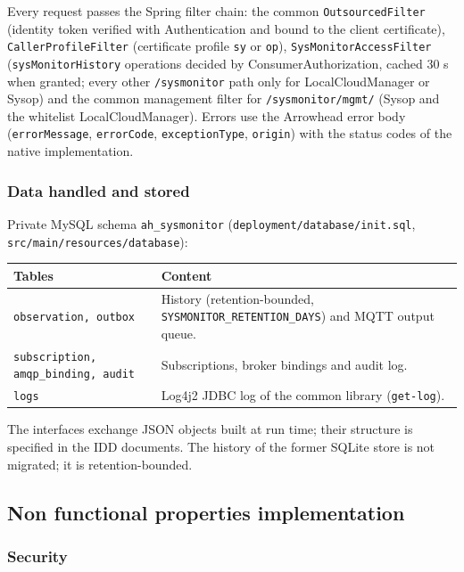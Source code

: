 \documentclass[a4paper]{arrowhead}
\begin{document}
Every request passes the Spring filter chain: the common \texttt{OutsourcedFilter} (identity token verified with Authentication and bound to the client certificate), \texttt{CallerProfileFilter} (certificate profile \texttt{sy} or \texttt{op}), \texttt{SysMonitorAccessFilter} (\texttt{sysMonitorHistory} operations decided by ConsumerAuthorization, cached 30 s when granted; every other \texttt{/sysmonitor} path only for LocalCloudManager or Sysop) and the common management filter for \texttt{/sysmonitor/\allowbreak{}mgmt/} (Sysop and the whitelist LocalCloudManager). Errors use the Arrowhead error body (\texttt{errorMessage}, \texttt{errorCode}, \texttt{exceptionType}, \texttt{origin}) with the status codes of the native implementation.

\subsubsection{Data handled and stored}

Private MySQL schema \texttt{ah\_\allowbreak{}sysmonitor} (\texttt{deployment/\allowbreak{}database/\allowbreak{}init.sql}, \texttt{src/\allowbreak{}main/\allowbreak{}resources/\allowbreak{}database}):

\noindent\begin{longtable}{| p{6.4cm} | p{8.8cm} |} \hline
\rowcolor{gray!33} Tables & Content \\ \hline \endhead
\texttt{observation,\allowbreak{} outbox} & History (retention-bounded, \texttt{SYSMONITOR\_\allowbreak{}RETENTION\_\allowbreak{}DAYS}) and MQTT output queue. \\ \hline
\texttt{subscription,\allowbreak{} amqp\_\allowbreak{}binding,\allowbreak{} audit} & Subscriptions, broker bindings and audit log. \\ \hline
\texttt{logs} & Log4j2 JDBC log of the common library (\texttt{get-\allowbreak{}log}). \\ \hline
\end{longtable}

The interfaces exchange JSON objects built at run time; their structure is specified in the IDD documents. The history of the former SQLite store is not migrated; it is retention-bounded.

\subsection{Non functional properties implementation}

\subsubsection{Security}
\end{document}
